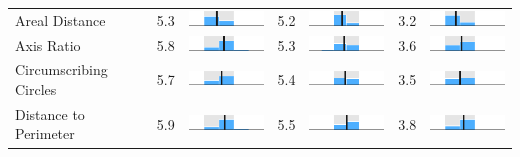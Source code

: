 \begin{table}
\begin{tabular}{l rm{7em} rm{7em} rm{7em}}
Areal Distance         &   5.3 &       \includegraphics[width=7em]{mini_hist/MN_2008_dist_a} &   5.2 &       \includegraphics[width=7em]{mini_hist/MN_2012_dist_a} &   3.2 &       \includegraphics[width=7em]{mini_hist/MN_2016_dist_a} \\
Axis Ratio             &   5.8 &   \includegraphics[width=7em]{mini_hist/MN_2008_axis_ratio} &   5.3 &   \includegraphics[width=7em]{mini_hist/MN_2012_axis_ratio} &   3.6 &   \includegraphics[width=7em]{mini_hist/MN_2016_axis_ratio} \\
Circumscribing Circles &   5.7 &        \includegraphics[width=7em]{mini_hist/MN_2008_reock} &   5.4 &        \includegraphics[width=7em]{mini_hist/MN_2012_reock} &   3.5 &        \includegraphics[width=7em]{mini_hist/MN_2016_reock} \\
Distance to Perimeter  &   5.9 &     \includegraphics[width=7em]{mini_hist/MN_2008_rohrbach} &   5.5 &     \includegraphics[width=7em]{mini_hist/MN_2012_rohrbach} &   3.8 &     \includegraphics[width=7em]{mini_hist/MN_2016_rohrbach} \\

\end{tabular}
\end{table}
